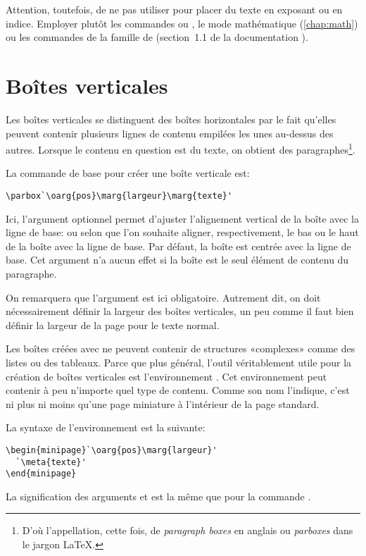 Attention, toutefois, de ne pas utiliser \cmd{\raisebox} pour placer
du texte en exposant ou en indice. Employer plutôt les commandes
\cmd{\textsuperscript} ou \cmd{\textsubscript}, le mode mathématique
(\autoref{chap:math}) ou les commandes de la famille \cmd{\ieme} de
 (section~1.1 de la documentation%
).

\section{Boîtes verticales}
\label{sec:boites:parbox}

Les boîtes verticales se distinguent des boîtes horizontales par le
fait qu'elles peuvent contenir plusieurs lignes de contenu empilées
les unes au-dessus des autres. Lorsque le contenu en question est du
texte, on obtient des paragraphes\footnote{%
  D'où l'appellation, cette fois, de \emph{paragraph boxes} en anglais
  ou \emph{parboxes} dans le jargon {\LaTeX}.}. %

La commande de base pour créer une boîte verticale est:
\begin{lstlisting}
\parbox`\oarg{pos}\marg{largeur}\marg{texte}'
\end{lstlisting}
Ici, l'argument optionnel  permet d'ajuster l'alignement
vertical de la boîte avec la ligne de base:  ou  selon
que l'on souhaite aligner, respectivement, le bas ou le haut de la
boîte avec la ligne de base. Par défaut, la boîte est centrée avec la
ligne de base. Cet argument n'a aucun effet si la boîte est le seul
élément de contenu du paragraphe.

On remarquera que l'argument  est ici obligatoire.
Autrement dit, on doit nécessairement définir la largeur des boîtes
verticales, un peu comme il faut bien définir la largeur de la page
pour le texte normal.

Les boîtes créées avec \cmd{\parbox} ne peuvent contenir de structures
«complexes» comme des listes ou des tableaux. Parce que plus général,
l'outil véritablement utile pour la création de boîtes verticales est
l'environnement . Cet environnement peut contenir à peu
n'importe quel type de contenu. Comme son nom l'indique, c'est ni plus
ni moins qu'une page miniature à l'intérieur de la page standard.

La syntaxe de l'environnement  est la suivante:
\begin{lstlisting}
\begin{minipage}`\oarg{pos}\marg{largeur}'
  `\meta{texte}'
\end{minipage}
\end{lstlisting}
La signification des arguments  et  est la
même que pour la commande .

